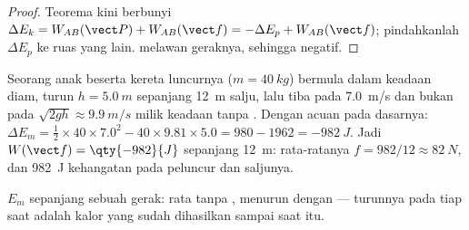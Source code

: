 \begin{proof}
Teorema  kini berbunyi
$\Delta E_k = W_{AB}(\vect P) +
W_{AB}(\vect f) = -\Delta E_p + W_{AB}(\vect f)$; pindahkanlah $\Delta E_p$ ke ruas yang lain. 
melawan geraknya, sehingga  negatif.
\end{proof}

\begin{example}\label{ex:g11:mechanical-energy:toboggan}
Seorang anak beserta kereta luncurnya ($m = \qty{40}{kg}$) bermula
dalam keadaan diam, turun $h = \qty{5.0}{m}$ sepanjang \qty{12}{m}
salju, lalu tiba pada \qty{7.0}{m/s} dan bukan pada
$\sqrt{2gh} \approx \qty{9.9}{m/s}$ milik keadaan tanpa . Dengan
acuan pada dasarnya:
$\Delta E_m = \tfrac12 \times 40 \times 7.0^2 - 40 \times 9.81
\times 5.0 = 980 - 1962 = \qty{-982}{J}$. Jadi
$W(\vect f) =
\qty{-982}{J}$ sepanjang \qty{12}{m}: 
rata-ratanya $f = 982/12 \approx \qty{82}{N}$, dan \qty{982}{J}
kehangatan pada peluncur dan saljunya.
\end{example}

\begin{omfigure}

{\small $E_m$ sepanjang sebuah gerak: rata tanpa , menurun
dengan  --- turunnya pada tiap saat adalah kalor yang sudah
dihasilkan sampai saat itu.}
\end{omfigure}

